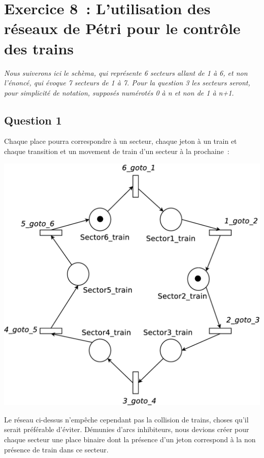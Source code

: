 \section*{Exercice 8~: L'utilisation des réseaux de Pétri pour le
  contrôle des trains}
  
\emph{Nous suiverons ici le schèma, qui représente 6 secteurs allant de 1 à 6, 
et non l'énoncé, qui évoque 7 secteurs de 1 à 7. Pour la question 3 les secteurs
seront, pour simplicité de notation, supposés numérotés 0 à n et non de 1 à n+1.}

\subsection*{Question 1}

Chaque place pourra correspondre à un secteur, chaque jeton à un train et chaque
transition et un movement de train d'un secteur à la prochaine~:

\begin{center}
\includegraphics[height = 0.3\paperwidth]{exo8_1.eps}
\end{center}

Le réseau ci-dessus n'empêche cependant pas la collision de trains, choses qu'il 
serait préférable d'éviter. Démunies d'arcs inhibiteurs, nous devions créer pour 
chaque secteur une place binaire dont la présence d'un jeton correspond à la non 
présence de train dans ce secteur.

